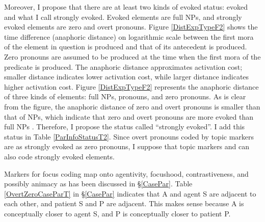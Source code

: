Moreover,
I propose that there are at least two kinds of evoked status:
evoked and what I call strongly evoked.
Evoked elements are full NPs, and
strongly evoked elements are zero and overt pronouns.
Figure \ref{DistExpTypeF2} shows the time difference (anaphoric distance) on logarithmic scale between the first mora of the element in question is produced and that of its antecedent is produced.
Zero pronouns are assumed to be produced at the time when
the first mora of the predicate is produced.
The anaphoric distance approximates activation cost;
smaller distance indicates lower activation cost,
while larger distance indicates higher activation cost.
Figure \ref{DistExpTypeF2} represents the anaphoric distance of three kinds of elements:
full NPs, pronouns, and zero pronouns.
As is clear from the figure,
the anaphoric distance of zero and overt pronouns is smaller than
that of NPs,
which indicate that
zero and overt pronouns are more evoked than full NPs .
Therefore, I propose the status called ``strongly evoked''.
I add this status in Table \ref{ParInfoStatusT2}.
Since overt pronouns coded by topic markers are as strongly evoked as zero pronouns,
I suppose that topic markers  and  can also code strongly evoked elements.

Markers for focus coding map onto agentivity, focushood, contrastiveness, and possibly animacy
as has been discussed in \S \ref{CasePar}.
Table \ref{OvertZeroCaseParT} in \S \ref{CasePar} indicates that
A and agent S are adjacent to each other, and
patient S and P are adjacent.
This makes sense because
A is conceptually closer to agent S, and
P is conceptually closer to patient P.

